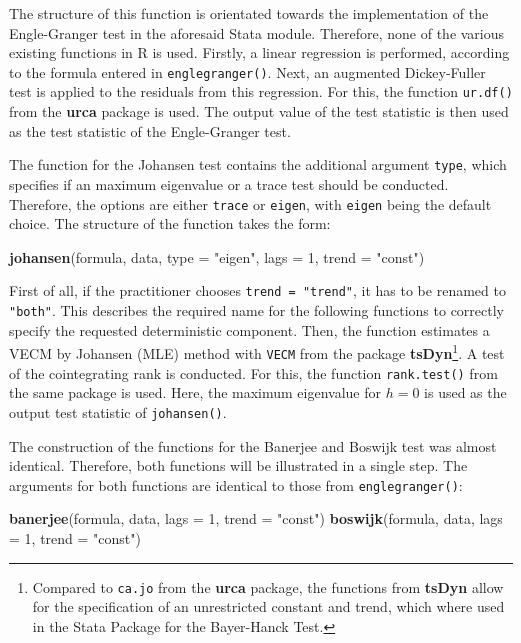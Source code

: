\documentclass[12pt,a4paper]{article}
\newenvironment{Shaded}{\begin{snugshade}}{\end{snugshade}}
\newcommand{\DataTypeTok}[1]{\textcolor[rgb]{0.13,0.29,0.53}{#1}}
\newcommand{\DecValTok}[1]{\textcolor[rgb]{0.00,0.00,0.81}{#1}}
\newcommand{\KeywordTok}[1]{\textcolor[rgb]{0.13,0.29,0.53}{\textbf{#1}}}
\newcommand{\NormalTok}[1]{#1}
\newcommand{\StringTok}[1]{\textcolor[rgb]{0.31,0.60,0.02}{#1}}
\let\rmarkdownfootnote\footnote%
\def\footnote{\protect\rmarkdownfootnote}
\begin{document}
The structure of this function is orientated towards the implementation
of the Engle-Granger test in the aforesaid Stata module. Therefore, none
of the various existing functions in R is used. Firstly, a linear
regression is performed, according to the formula entered in
\texttt{englegranger()}. Next, an augmented Dickey-Fuller test is
applied to the residuals from this regression. For this, the function
\texttt{ur.df()} from the \textbf{urca} package is used. The output
value of the test statistic is then used as the test statistic of the
Engle-Granger test.

The function for the Johansen test contains the additional argument
\texttt{type}, which specifies if an maximum eigenvalue or a trace test
should be conducted. Therefore, the options are either \texttt{trace} or
\texttt{eigen}, with \texttt{eigen} being the default choice. The
structure of the function takes the form:

\begin{Shaded}
\begin{Highlighting}[]
\KeywordTok{johansen}\NormalTok{(formula, data, }\DataTypeTok{type =} \StringTok{"eigen"}\NormalTok{, }\DataTypeTok{lags =} \DecValTok{1}\NormalTok{, }\DataTypeTok{trend =} \StringTok{"const"}\NormalTok{)}
\end{Highlighting}
\end{Shaded}

First of all, if the practitioner chooses \texttt{trend\ =\ "trend"}, it
has to be renamed to \texttt{"both"}. This describes the required name
for the following functions to correctly specify the requested
deterministic component. Then, the function estimates a VECM by Johansen
(MLE) method with \texttt{VECM} from the package
\textbf{tsDyn}\footnote{Compared to \texttt{ca.jo} from the
  \textbf{urca} package, the functions from \textbf{tsDyn} allow for the
  specification of an unrestricted constant and trend, which where used
  in the Stata Package for the Bayer-Hanck Test.}. A test of the
cointegrating rank is conducted. For this, the function
\texttt{rank.test()} from the same package is used. Here, the maximum
eigenvalue for \(h = 0\) is used as the output test statistic of
\texttt{johansen()}.

The construction of the functions for the Banerjee and Boswijk test was
almost identical. Therefore, both functions will be illustrated in a
single step. The arguments for both functions are identical to those
from \texttt{englegranger()}:

\begin{Shaded}
\begin{Highlighting}[]
\KeywordTok{banerjee}\NormalTok{(formula, data, }\DataTypeTok{lags =} \DecValTok{1}\NormalTok{, }\DataTypeTok{trend =} \StringTok{"const"}\NormalTok{)}
\KeywordTok{boswijk}\NormalTok{(formula, data, }\DataTypeTok{lags =} \DecValTok{1}\NormalTok{, }\DataTypeTok{trend =} \StringTok{"const"}\NormalTok{)}
\end{Highlighting}
\end{Shaded}
\end{document}
